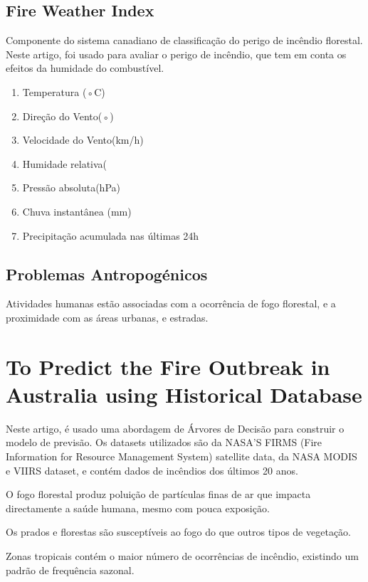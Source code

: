 \documentclass{article}
\begin{document}
\subsection{Fire Weather Index} 
Componente do sistema canadiano de classificação do perigo de incêndio florestal. Neste artigo, foi usado para avaliar o perigo de incêndio, que tem em conta os efeitos da humidade do combustível.

\begin{enumerate}
    \item Temperatura (◦C)
    \item Direção do Vento(◦)
    \item Velocidade do Vento(km/h)
    \item Humidade relativa(%
    \item Pressão absoluta(hPa)
    \item Chuva instantânea (mm)
    \item Precipitação acumulada nas últimas 24h
\end{enumerate}

\subsection{Problemas Antropogénicos}
Atividades humanas estão associadas com a ocorrência de fogo florestal, e a proximidade com as áreas urbanas, e estradas.


\section{To Predict the Fire Outbreak in Australia using 
Historical Database \cite{9964603}}
\label{sec:To Predict the Fire Outbreak in Australia using Historical Database}
Neste artigo, é usado uma abordagem de Árvores de Decisão para construir o modelo de previsão. Os datasets utilizados são da NASA'S FIRMS (Fire Information for Resource Management System) satellite data, da NASA MODIS e VIIRS dataset, e contém dados de incêndios dos últimos 20 anos.\par
O fogo florestal produz poluição de partículas finas de ar que impacta directamente a saúde humana, mesmo com pouca exposição.\par
Os prados e florestas são susceptíveis ao fogo do que
outros tipos de vegetação.\par
Zonas tropicais contém o maior número de ocorrências de incêndio, existindo um padrão de frequência sazonal.
\end{document}
